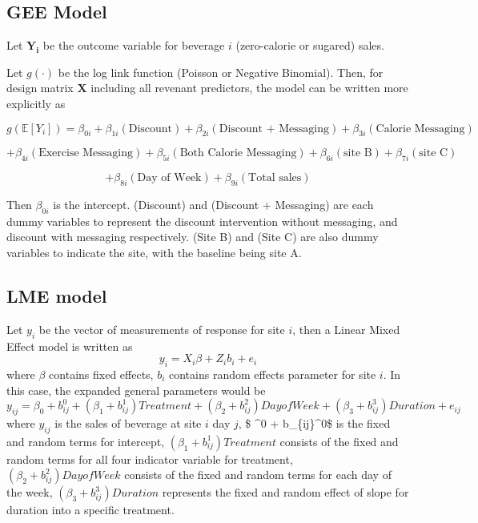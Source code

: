 \documentclass[
]{article}
\begin{document}
\hypertarget{gee-model}{%
\subsection{GEE Model}\label{gee-model}}

Let \(\mathbf{Y_i}\) be the outcome variable for beverage \(i\) (zero-calorie or sugared) sales.

Let \(g(\cdot)\) be the log link function (Poisson or Negative Binomial). Then, for design matrix \(\mathbf{X}\) including all revenant predictors, the model can be written more explicitly as

\[
g(\mathbb{E}[Y_i]) = \beta_{0i} + \beta_{1i} (\text{Discount}) + \beta_{2i} (\text{Discount + Messaging}) + \beta_{3i} (\text{Calorie Messaging}) 
\]

\[
+ \beta_{4i} (\text{Exercise Messaging}) + \beta_{5i} (\text{Both Calorie Messaging}) + \beta_{6i} (\text{site B}) + \beta_{7i} (\text{site C})
\]

\[
+ \beta_{8i} (\text{Day of Week})+ \beta_{9i} (\text{Total sales})
\]

Then \(\beta_{0i}\) is the intercept. (Discount) and (Discount + Messaging) are each dummy variables to represent the discount intervention without messaging, and discount with messaging respectively. (Site B) and (Site C) are also dummy variables to indicate the site, with the baseline being site A.

\hypertarget{lme-model}{%
\subsection{LME model}\label{lme-model}}

Let \(y_i\) be the vector of measurements of response for site \(i\), then a Linear Mixed Effect model is written as
\[y_i = X_i\beta + Z_i b_i + e_i\]
where \(\beta\) contains fixed effects, \(b_i\) contains random effects parameter for site \(i\). In this case, the expanded general parameters would be
\[y_{ij}  = \beta_0 + b_{ij}^0 + (\beta_1 + b_{ij}^1)Treatment + (\beta_2 + b_{ij}^2)Day of Week +(\beta_3 + b_{ij}^3)Duration +e_{ij}\]
where \(y_{ij}\) is the sales of beverage at site \(i\) day \(j\), \$ \beta\^{}0 + b\_\{ij\}\^{}0\$ is the fixed and random terms for intercept, \((\beta_1 + b_{ij}^1)Treatment\) consists of the fixed and random terms for all four indicator variable for treatment, \((\beta_2 + b_{ij}^2)Day of Week\) consists of the fixed and random terms for each day of the week, \((\beta_3 + b_{ij}^3)Duration\) represents the fixed and random effect of slope for duration into a specific treatment.
\end{document}
